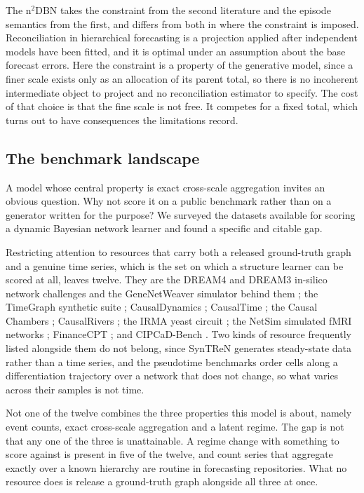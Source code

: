 The n\(^2\)DBN takes the constraint from the second literature and the episode
semantics from the first, and differs from both in where the constraint is
imposed. Reconciliation in hierarchical forecasting is a projection applied after
independent models have been fitted, and it is optimal under an assumption about
the base forecast errors. Here the constraint is a property of the generative
model, since a finer scale exists only as an allocation of its parent total, so
there is no incoherent intermediate object to project and no reconciliation
estimator to specify. The cost of that choice is that the fine scale is not free.
It competes for a fixed total, which turns out to have consequences the
limitations record.

\subsection{The benchmark landscape}
\label{sec:related_benchmarks}

A model whose central property is exact cross-scale aggregation invites an
obvious question. Why not score it on a public benchmark rather than on a
generator written for the purpose? We surveyed the datasets available for scoring
a dynamic Bayesian network learner and found a specific and citable gap.

Restricting attention to resources that carry both a released ground-truth graph
and a genuine time series, which is the set on which a structure learner can be
scored at all, leaves twelve. They are the DREAM4 and DREAM3 in-silico network
challenges \citep{marbach2010revealing, prill2010dream3} and the GeneNetWeaver
simulator behind them \citep{schaffter2011gnw}; the TimeGraph synthetic suite
\citep{ferdous2025timegraph}; CausalDynamics \citep{herdeanu2025causaldynamics};
CausalTime \citep{cheng2024causaltime}; the Causal Chambers
\citep{gamella2025causalchambers}; CausalRivers \citep{stein2025causalrivers};
the IRMA yeast circuit \citep{cantone2009irma}; the NetSim simulated fMRI
networks \citep{smith2011netsim}; FinanceCPT \citep{nauta2019tcdf}; and
CIPCaD-Bench \citep{menegozzo2022cipcad}. Two kinds of resource frequently
listed alongside them do not belong, since SynTReN generates steady-state data
rather than a time series, and the pseudotime benchmarks order cells along a
differentiation trajectory over a network that does not change, so what varies
across their samples is not time.

Not one of the twelve combines the three properties this model is about, namely
event counts, exact cross-scale aggregation and a latent regime. The gap is not
that any one of the three is unattainable. A regime change with something to
score against is present in five of the twelve, and count series that aggregate
exactly over a known hierarchy are routine in forecasting repositories. What no
resource does is release a ground-truth graph alongside all three at once.

